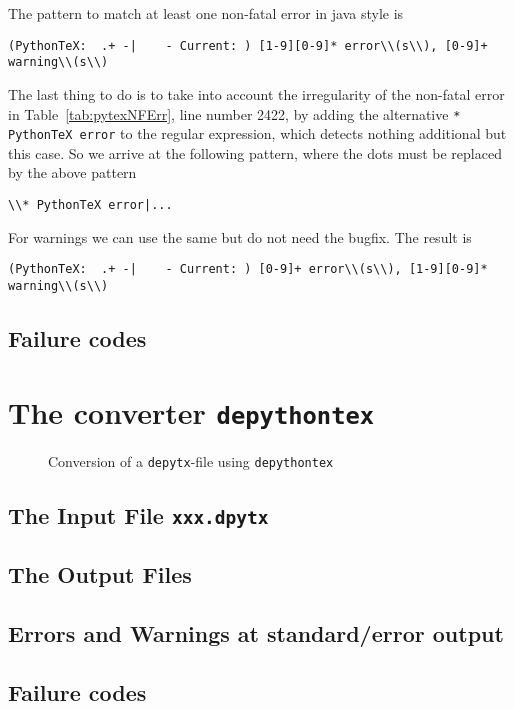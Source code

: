 \documentclass{article}
\newcommand{\dpytex}{\texttt{depythontex}}
\begin{document}
The pattern to match at least one non-fatal error in java style is 
%
\begin{Verbatim}[showspaces=true, fontsize=\small]
(PythonTeX:  .+ -|    - Current: ) [1-9][0-9]* error\\(s\\), [0-9]+ warning\\(s\\)
\end{Verbatim}
%
The last thing to do is to take into account the irregularity 
of the non-fatal error in Table~\ref{tab:pytexNFErr}, line number 2422, 
by adding the alternative \texttt{* PythonTeX error} to the regular expression, 
which detects nothing additional but this case. 
So we arrive at the following pattern, where the dots must be replaced by the above pattern 
%
\begin{Verbatim}[showspaces=true, fontsize=\small]
\\* PythonTeX error|...
\end{Verbatim}

For warnings we can use the same but do not need the bugfix. 
The result is 
%
\begin{Verbatim}[showspaces=true, fontsize=\small]
(PythonTeX:  .+ -|    - Current: ) [0-9]+ error\\(s\\), [1-9][0-9]* warning\\(s\\)
\end{Verbatim}
  


\subsection{Failure codes}\label{subsec:pytexFCodes}

\section{The converter \dpytex}\label{sec:dpytex}

\begin{figure}[htb]
  \centering
  \caption{\label{fig:depy2out}Conversion of a \texttt{depytx}-file using \texttt{depythontex}}
  \end{figure}


\subsection{The Input File \texttt{xxx.dpytx}}\label{subsec:dpytexInFile}

\subsection{The Output Files}\label{subsec:dpytexOutFile}

\subsection{Errors and Warnings at standard/error output}\label{subsec:dpytexErrWarn}

\subsection{Failure codes}\label{subsec:dpytexFCodes}



{}%
\end{document}
